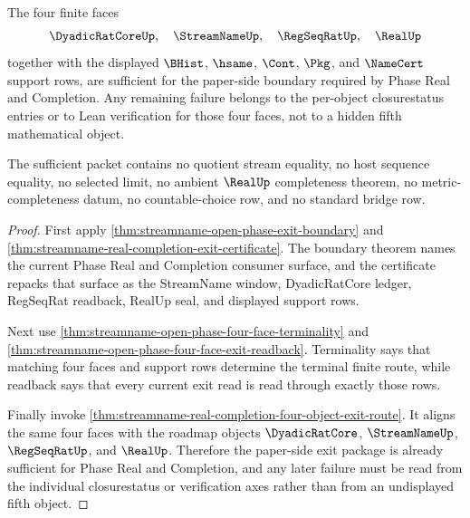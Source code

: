 \begin{theorem}
\label{thm:streamname-open-phase-four-object-sufficiency}
The four finite faces
$$
\DyadicRatCoreUp,\quad \StreamNameUp,\quad \RegSeqRatUp,\quad \RealUp
$$
together with the displayed $\BHist$, $\hsame$, $\Cont$, $\Pkg$, and $\NameCert$ support rows, are sufficient for the paper-side boundary required by Phase Real and Completion. Any remaining failure belongs to the per-object closurestatus entries or to Lean verification for those four faces, not to a hidden fifth mathematical object.

The sufficient packet contains no quotient stream equality, no host sequence equality, no selected limit, no ambient $\RealUp$ completeness theorem, no metric-completeness datum, no countable-choice row, and no standard bridge row.
\end{theorem}
\begin{proof}
First apply \autoref{thm:streamname-open-phase-exit-boundary} and \autoref{thm:streamname-real-completion-exit-certificate}. The boundary theorem names the current Phase Real and Completion consumer surface, and the certificate repacks that surface as the StreamName window, DyadicRatCore ledger, RegSeqRat readback, RealUp seal, and displayed support rows.

Next use \autoref{thm:streamname-open-phase-four-face-terminality} and \autoref{thm:streamname-open-phase-four-face-exit-readback}. Terminality says that matching four faces and support rows determine the terminal finite route, while readback says that every current exit read is read through exactly those rows.

Finally invoke \autoref{thm:streamname-real-completion-four-object-exit-route}. It aligns the same four faces with the roadmap objects $\DyadicRatCore$, $\StreamNameUp$, $\RegSeqRatUp$, and $\RealUp$. Therefore the paper-side exit package is already sufficient for Phase Real and Completion, and any later failure must be read from the individual closurestatus or verification axes rather than from an undisplayed fifth object.
\end{proof}

